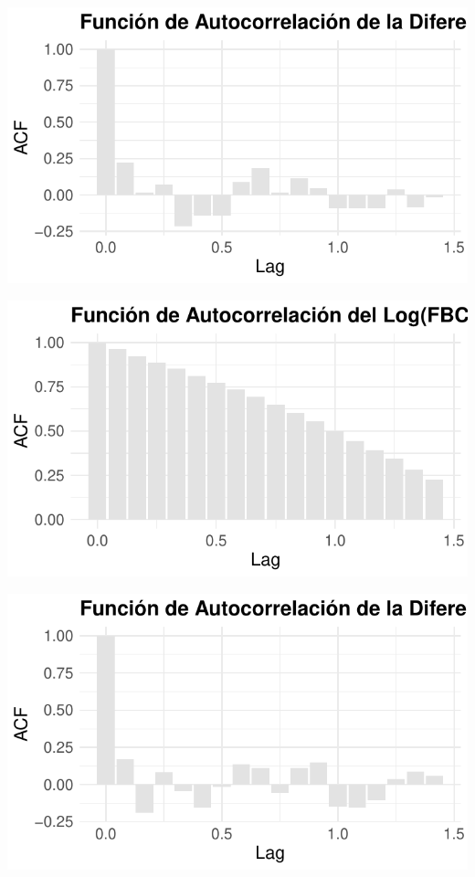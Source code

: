 \documentclass[
  12pt,
]{article}
\begin{document}
\begin{center}\includegraphics{ensayo_files/figure-latex/unnamed-chunk-13-1} \end{center}

\begin{center}\includegraphics{ensayo_files/figure-latex/unnamed-chunk-14-1} \end{center}

\begin{center}\includegraphics{ensayo_files/figure-latex/unnamed-chunk-15-1} \end{center}
\end{document}
